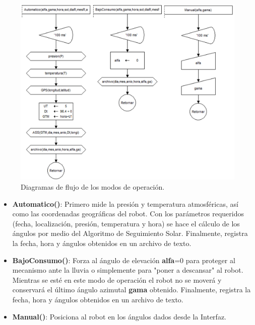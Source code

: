 \begin{figure}[H]
	\centering
	\includegraphics[width=\columnwidth]{imagenes/DFmodos}
	\caption{Diagramas de flujo de los modos de operación.}
	\label{fig:DFmodos}
\end{figure}

\begin{itemize}
    \item \textbf{Automatico()}: Primero mide la presión y temperatura atmosféricas, así como las coordenadas geográficas del robot. Con los parámetros requeridos (fecha, localización, presión, temperatura y hora) se hace el cálculo de los ángulos por medio del Algoritmo de Seguimiento Solar. Finalmente, registra la fecha, hora y ángulos obtenidos en un archivo de texto.
    \item \textbf{BajoConsumo()}: Forza al ángulo de elevación \textbf{alfa}=0 para proteger al mecanismo ante la lluvia o simplemente para "poner a descansar" al robot. Mientras se esté en este modo de operación el robot no se moverá y conservará el último ángulo azimutal \textbf{gama} obtenido. Finalmente, registra la fecha, hora y ángulos obtenidos en un archivo de texto.
    \item \textbf{Manual()}: Posiciona al robot en los ángulos dados desde la Interfaz.
\end{itemize}

